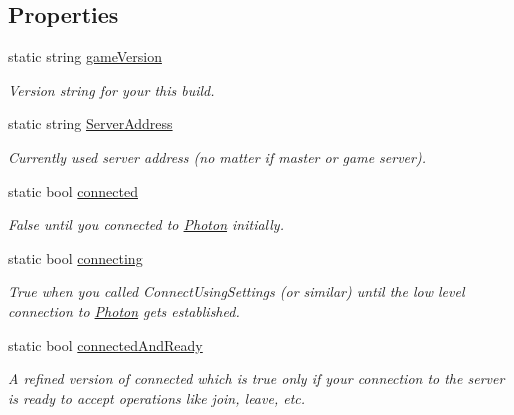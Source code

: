\subsection*{Properties}
\begin{DoxyCompactItemize}
\item 
static string \hyperlink{class_photon_network_a2a8b1690325d73930d6bc8b99d8e736d}{game\+Version}
\begin{DoxyCompactList}\small\item\em Version string for your this build. \end{DoxyCompactList}\item 
static string \hyperlink{class_photon_network_a3b90d30007fbeced0293dde881d0421e}{Server\+Address}
\begin{DoxyCompactList}\small\item\em Currently used server address (no matter if master or game server).\end{DoxyCompactList}\item 
static bool \hyperlink{class_photon_network_ad96fd99b5e9384771ee44b427edf7487}{connected}
\begin{DoxyCompactList}\small\item\em False until you connected to \hyperlink{namespace_photon}{Photon} initially. \end{DoxyCompactList}\item 
static bool \hyperlink{class_photon_network_a0141dc0df0d2e0a7fcda2e2101c44254}{connecting}
\begin{DoxyCompactList}\small\item\em True when you called Connect\+Using\+Settings (or similar) until the low level connection to \hyperlink{namespace_photon}{Photon} gets established. \end{DoxyCompactList}\item 
static bool \hyperlink{class_photon_network_a7698c3e61503df2cb5375ffc3182fb1f}{connected\+And\+Ready}
\begin{DoxyCompactList}\small\item\em A refined version of connected which is true only if your connection to the server is ready to accept operations like join, leave, etc. \end{DoxyCompactList}\item 

\end{DoxyCompactItemize}
